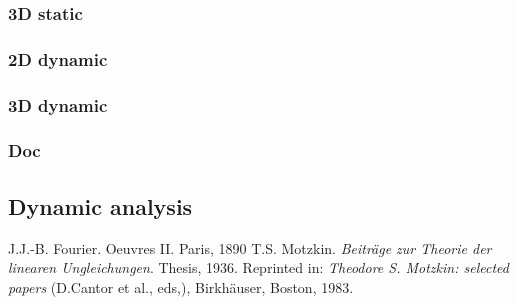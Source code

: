 \documentclass[12pt, a4paper]{article}
\begin{document}
\subsubsection{3D static}

\begin{scriptsize}
\begin{ttfamily}

\end{ttfamily}
\end{scriptsize}

\subsubsection{2D dynamic}

\begin{scriptsize}
\begin{ttfamily}

\end{ttfamily}
\end{scriptsize}

\subsubsection{3D dynamic}

\begin{scriptsize}
\begin{ttfamily}

\end{ttfamily}
\end{scriptsize}

\subsubsection{Doc}

\begin{scriptsize}
\begin{ttfamily}

\end{ttfamily}
\end{scriptsize}

\subsection{Dynamic analysis}

\begin{scriptsize}
\begin{ttfamily}

\end{ttfamily}
\end{scriptsize}

\begin{thebibliography}{9}
 J.J.-B. Fourier. Oeuvres II. Paris, 1890
 T.S. Motzkin. {\em Beitr\"{a}ge zur Theorie der linearen Ungleichungen}. Thesis, 1936. Reprinted in: {\em Theodore S. Motzkin: selected papers} (D.Cantor et al., eds,), Birkh\"{a}user, Boston, 1983.
\end{thebibliography}
\end{document}
